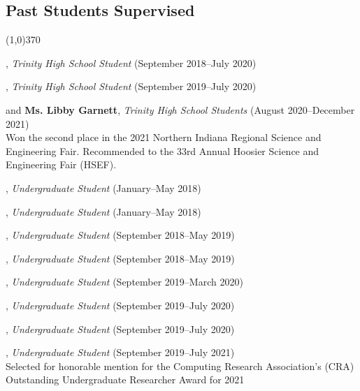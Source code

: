 \documentclass[10pt]{article}
\newenvironment{myindentpar}[1]%
{\begin{list}{}%
         {\setlength{\leftmargin}{#1}}%
         \item[]%
}
{\end{list}}
\newcounter{list}
\begin{document}
\subsection{\sc Past Students Supervised}
\vspace{-0.4cm} \line(1,0){370} \vspace{-0.1cm}

\begin{myindentpar}{0.75cm}

\hspace{-0.75cm}{\bf Eric Zhang}, \textit{Trinity High School Student} (September 2018--July 2020)

\hspace{-0.75cm}{\bf Michael Florin}, \textit{Trinity High School Student} (September 2019--July 2020)

\hspace{-0.75cm}{\bf Ms. Rebekah Fang} and {\bf Ms. Libby Garnett}, \textit{Trinity High School Students} (August 2020--December 2021) \\
	Won the second place in the 2021 Northern Indiana Regional Science and Engineering Fair. Recommended to the 33rd Annual Hoosier Science and Engineering Fair (HSEF).

\hspace{-0.75cm}{\bf Matthew Malir}, \textit{Undergraduate Student} (January--May 2018)
	
\hspace{-0.75cm}{\bf Sebastian Miner}, \textit{Undergraduate Student} (January--May 2018)

\hspace{-0.75cm}{\bf Matthew Schoenbauer}, \textit{Undergraduate Student} (September 2018--May 2019)
	
\hspace{-0.75cm}{\bf Ms. Yuhan (Tina) Wu}, \textit{Undergraduate Student} (September 2018--May 2019)

\hspace{-0.75cm}{\bf Chan Hee Song}, \textit{Undergraduate Student} (September 2019--March 2020)

\hspace{-0.75cm}{\bf Xiangyu Dong}, \textit{Undergraduate Student} (September 2019--July 2020)

\hspace{-0.75cm}{\bf Tianze Zheng}, \textit{Undergraduate Student} (September 2019--July 2020)

\hspace{-0.75cm}{\bf Bo Ni}, \textit{Undergraduate Student} (September 2019--July 2021) \\
	Selected for honorable mention for the Computing Research Association's (CRA) Outstanding Undergraduate Researcher Award for 2021


\end{myindentpar}
\end{document}
